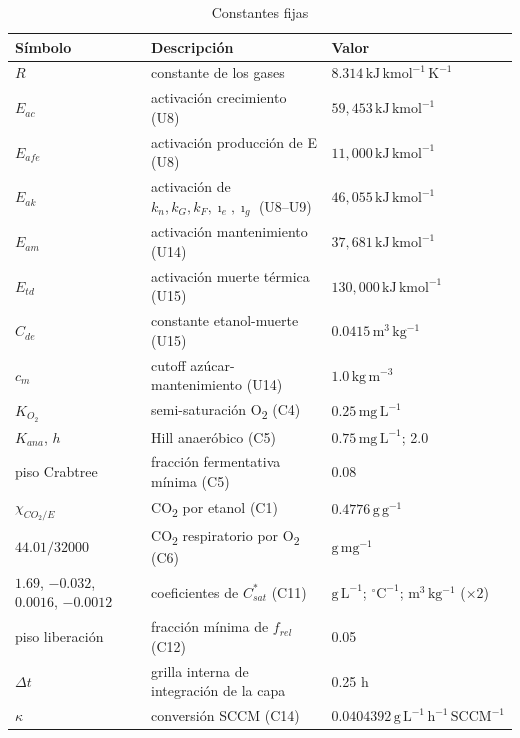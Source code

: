 \documentclass[11pt,a4paper]{article}
\newcommand{\gL}{\ensuremath{\mathrm{g\,L^{-1}}}}
\begin{document}
\begin{small}
\begin{longtable}{@{}l p{7.4cm} p{4.4cm}@{}}
\caption{Constantes fijas}\\
\toprule
Símbolo & Descripción & Valor \\
\midrule
\endhead
$R$ & constante de los gases & $\mathrm{8.314\,kJ\,kmol^{-1}\,K^{-1}}$ \\
$E_{ac}$ & activación crecimiento (U8) & $\mathrm{59{,}453\,kJ\,kmol^{-1}}$ \\
$E_{afe}$ & activación producción de E (U8) & $\mathrm{11{,}000\,kJ\,kmol^{-1}}$ \\
$E_{ak}$ & activación de $k_n,k_G,k_F,\imath_e,\imath_g$ (U8--U9) & $\mathrm{46{,}055\,kJ\,kmol^{-1}}$ \\
$E_{am}$ & activación mantenimiento (U14) & $\mathrm{37{,}681\,kJ\,kmol^{-1}}$ \\
$E_{td}$ & activación muerte térmica (U15) & $\mathrm{130{,}000\,kJ\,kmol^{-1}}$ \\
$C_{de}$ & constante etanol-muerte (U15) & $\mathrm{0.0415\,m^{3}\,kg^{-1}}$ \\
$c_m$ & cutoff azúcar-mantenimiento (U14) & $\mathrm{1.0\,kg\,m^{-3}}$ \\
$K_{O_2}$ & semi-saturación O\textsubscript{2} (C4) & $\mathrm{0.25\,mg\,L^{-1}}$ \\
$K_{ana}$, $h$ & Hill anaeróbico (C5) & $\mathrm{0.75\,mg\,L^{-1}}$; 2.0 \\
piso Crabtree & fracción fermentativa mínima (C5) & 0.08 \\
$\chi_{CO_2/E}$ & CO\textsubscript{2} por etanol (C1) & $\mathrm{0.4776\,g\,g^{-1}}$ \\
$44.01/32000$ & CO\textsubscript{2} respiratorio por O\textsubscript{2} (C6) & $\mathrm{g\,mg^{-1}}$ \\
$1.69$, $-0.032$, $0.0016$, $-0.0012$ & coeficientes de $C^*_{sat}$ (C11) & $\gL$; $\mathrm{{}^{\circ}C^{-1}}$; $\mathrm{m^{3}\,kg^{-1}}$ ($\times 2$) \\
piso liberación & fracción mínima de $f_{rel}$ (C12) & 0.05 \\
$\Delta t$ & grilla interna de integración de la capa & 0.25 h \\
$\kappa$ & conversión SCCM (C14) & $\mathrm{0.0404392\,g\,L^{-1}\,h^{-1}\,SCCM^{-1}}$ \\
\bottomrule
\end{longtable}
\end{small}
\end{document}
